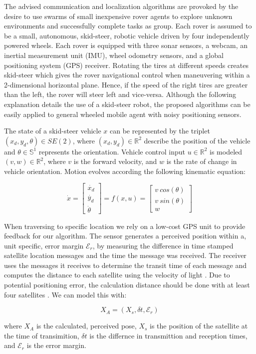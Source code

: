 The advised communication and localization algorithms are provoked by the desire to use swarms of small inexpensive rover agents to explore unknown environments and successfully complete tasks as group. Each rover is assumed to be a small, autonomous, skid-steer, robotic vehicle driven by four independently powered wheels. Each rover is equipped with three sonar sensors, a webcam, an inertial measurement unit (IMU), wheel odometry sensors, and a global positioning system (GPS) receiver. Rotating the tires at different speeds creates skid-steer which gives the rover navigational control when maneuvering within a 2-dimensional horizontal plane. Hence, if the speed of the right tires are greater than the left, the rover will steer left and vice-versa. Although the following explanation details the use of a skid-steer robot, the proposed algorithms can be easily applied to general wheeled mobile agent with noisy positioning sensors.

The state of a skid-steer vehicle $x$ can be represented by the triplet $(x_d, y_d, \theta) \in SE(2)$, where $(x_d, y_d) \in \mathbb{R}^2$ describe the position of the vehicle and $\theta \in \mathbb{S}^1$ represents the orientation. Vehicle control input $u \in \mathbb{R}^2$ is modeled $(v, w) \in \mathbb{R}^2$, where $v$ is the forward velocity, and $w$ is the rate of change in vehicle orientation. Motion evolves according the following kinematic equation:

\begin{equation} \label{skid-steer}
	\dot{x} = 
	\begin{bmatrix}
	\dot{x_d} \\ \dot{y_d} \\ \dot{\theta}
	\end{bmatrix}
	= f(x, u) = 
	\begin{bmatrix}
	v~cos(\theta) \\ v~sin(\theta) \\ w 
	\end{bmatrix}
\end{equation}

When traversing to specific location we rely on a low-cost GPS unit to provide feedback for our algorithm. The sensor generates a perceived position within a, unit specific, error margin $\mathcal{E}_r$, by measuring the difference in time stamped satellite location messages and the time the message was received.  The receiver uses the messages it receives to determine the transit time of each message and computes the distance to each satellite using the velocity of light \cite{rahemi2014accurate}. Due to potential positioning error, the calculation distance should be done with at least four satellites \cite{rahemi2014accurate}. We can model this with:

\begin{equation}
	X_A= (X_s, \delta t, \mathcal{E}_r)
\end{equation}

where $X_A$ is the calculated, perceived pose, $X_s$ is the position of the satellite at the time of transimition, $\delta t$ is the differnce in transmittion and reception times, and $\mathcal{E}_r$ is the error margin.